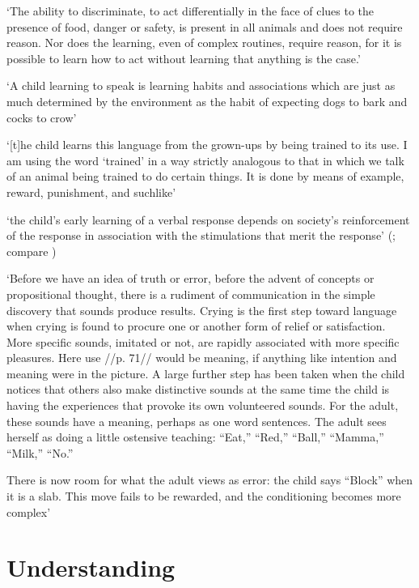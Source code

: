 \documentclass[12pt]{extarticle}
\begin{document}
\begin{multicols}{3}
‘The ability to discriminate, to act differentially in the face of clues to the presence of food, danger or safety, is present in all animals and does not require reason. Nor does the learning, even of complex routines, require reason, for it is possible to learn how to act without learning that anything is the case.’
\citep[p.\ 326]{Davidson:1982je}
 
‘A child learning to speak is learning habits and associations which are just as much determined by the environment as the habit of expecting dogs to bark and cocks to crow’
\citep[p.\ 71]{Russell:1921ww}
 
‘[t]he child learns this language from the grown-ups by being trained to its use. I am using the word ‘trained’ in a way strictly analogous to that in which we talk of an animal being trained to do certain things. It is done by means of example, reward, punishment, and suchlike’
\citep[p.\ 77]{Wittgenstein:1972lj}
 
‘the child’s early learning of a verbal response depends on society's reinforcement of the response in association with the stimulations that merit the response’
(\citep[p.\ 82]{Quine:1960fe}; compare \citep[pp.\ 28--9]{Quine:1974rd})
 
‘Before we have an idea of truth or error, before the advent of concepts or propositional thought,
there is a rudiment of communication in the simple discovery that sounds produce results. Crying is the first step toward language when crying is found to procure one or another form of relief or satisfaction. More specific sounds, imitated or not, are rapidly associated with more specific pleasures.
Here use //p. 71// would be meaning, if anything like intention and meaning were in the picture.
A large further step has been taken when the child notices that others also make distinctive sounds at the same time the child is having the experiences that provoke its own volunteered sounds.
For the adult, these sounds have a meaning, perhaps as one word sentences. The adult sees herself as doing a little ostensive teaching: “Eat,” “Red,” “Ball,” “Mamma,” “Milk,” “No.”
 
There is now room for what the adult views as error: the child says “Block” when it is a slab. This move fails to be rewarded, and the conditioning becomes more complex’
\citep[pp.\ 70--1]{Davidson:2000mt}
 
 
 
\section{Understanding}
 

\end{multicols}
\end{document}
